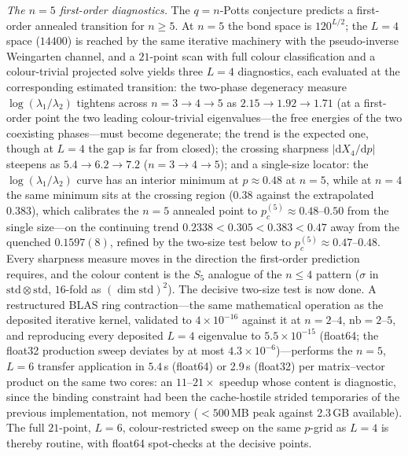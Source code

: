 \documentclass[aps,prx,reprint,superscriptaddress,nobibnotes,longbibliography]{revtex4-2}
\theoremstyle{remark}
\begin{document}
\emph{The $n=5$ first-order diagnostics.}  The $q=n$-Potts conjecture predicts a first-order annealed transition for $n\ge5$.  At $n=5$ the bond space is $120^{L/2}$; the $L=4$ space ($14400$) is reached by the same iterative machinery with the pseudo-inverse Weingarten channel, and a $21$-point scan with full colour classification and a colour-trivial projected solve yields three $L=4$ diagnostics, each evaluated at the corresponding estimated transition: the two-phase degeneracy measure $\log(\lambda_1/\lambda_2)$ tightens across $n=3\to4\to5$ as $2.15\to1.92\to1.71$ (at a first-order point the two leading colour-trivial eigenvalues---the free energies of the two coexisting phases---must become degenerate; the trend is the expected one, though at $L=4$ the gap is far from closed); the crossing sharpness $|\mathrm dX_4/\mathrm dp|$ steepens as $5.4\to6.2\to7.2$ ($n=3\to4\to5$); and a single-size locator: the $\log(\lambda_1/\lambda_2)$ curve has an interior minimum at $p\approx0.48$ at $n=5$, while at $n=4$ the same minimum sits at the crossing region ($0.38$ against the extrapolated $0.383$), which calibrates the $n=5$ annealed point to $p_c^{(5)}\approx0.48$--$0.50$ from the single size---on the continuing trend $0.2338<0.305<0.383<0.47$ away from the quenched $0.1597(8)$, refined by the two-size test below to $p_c^{(5)}\approx0.47$--$0.48$.  Every sharpness measure moves in the direction the first-order prediction requires, and the colour content is the $S_5$ analogue of the $n\le4$ pattern ($\sigma$ in $\mathrm{std}\otimes\mathrm{std}$, $16$-fold as $(\dim\mathrm{std})^2$).  The decisive two-size test is now done.  A restructured BLAS ring contraction---the same mathematical operation as the deposited iterative kernel, validated to $4\times10^{-16}$ against it at $n=2$--$4$, $\mathrm{nb}=2$--$5$, and reproducing every deposited $L=4$ eigenvalue to $5.5\times10^{-15}$ (float64; the float32 production sweep deviates by at most $4.3\times10^{-6}$)---performs the $n=5$, $L=6$ transfer application in $5.4$\,s (float64) or 2.9\,s (float32) per matrix--vector product on the same two cores: an $11$--$21\times$ speedup whose content is diagnostic, since the binding constraint had been the cache-hostile strided temporaries of the previous implementation, not memory ($<500$\,MB peak against 2.3\,GB available).  The full $21$-point, $L=6$, colour-restricted sweep on the same $p$-grid as $L=4$ is thereby routine, with float64 spot-checks at the decisive points.
\end{document}
